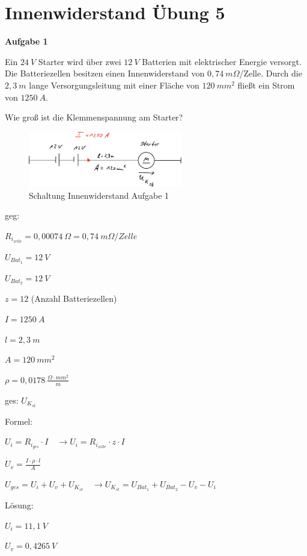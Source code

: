 \section{Innenwiderstand Übung 5}\label{innenwiderstand-uebung-5}

\textbf{Aufgabe 1}

Ein $24~V$ Starter wird über zwei $12~V$ Batterien mit elektrischer
Energie versorgt. Die Batteriezellen besitzen einen Innenwiderstand von
$0,74~m\Omega$/Zelle. Durch die $2,3~m$ lange Versorgungsleitung mit
einer Fläche von $120~mm^2$ fließt ein Strom von $1250~A$.

Wie groß ist die Klemmenspannung am Starter?

\begin{figure}[!ht]%
\centering
\includegraphics[width=0.6\textwidth]{images/Skizze/20_FM_Nr5_Innenwiderstand_Aufg1_Skizze.pdf}
\caption{Schaltung Innenwiderstand Aufgabe 1}
\end{figure}

geg:

$R_{i_{zelle}} = 0,00074~\Omega = 0,74~m \Omega /Zelle$

$U_{{Bat}_1} = 12~V$

$U_{{Bat}_2}= 12~V$

$z = 12$ (Anzahl Batteriezellen)

$I = 1250~A$

$l = 2,3~m$

$A = 120~mm^2$

$\rho = 0,0178~\frac{\Omega \cdot mm^2}{m}$

ges: $U_{K_{st}}$

Formel:

$U_i = R_{i_{ges}} \cdot I \quad \to U_i = R_{i_{zelle}} \cdot z \cdot I$

$U_v = \frac{I \cdot \rho \cdot l}{A}$

$U_{ges} = U_i + U_v + U_{K_{st}} \quad \to U_{K_{st}} = U_{{Bat}_1} + U_{{Bat}_2} - U_v - U_i$

Lösung:

$U_i = 11,1~V$

$U_v = 0,4265~V$

